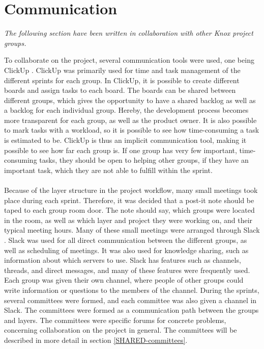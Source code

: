 \section{Communication}\label{communication_in_knox}
\textit{The following section have been written in collaboration with other Knox project groups.}


To collaborate on the project, several communication tools were used, one being ClickUp \cite{clickup}. ClickUp was primarily used for time and task management of the different sprints for each group. In ClickUp, it is possible to create different boards and assign tasks to each board. The boards can be shared between different groups, which gives the opportunity to have a shared backlog as well as a backlog for each individual group. Hereby, the development process becomes more transparent for each group, as well as the product owner. It is also possible to mark tasks with a workload, so it is possible to see how time-consuming a task is estimated to be. ClickUp is thus an implicit communication tool, making it possible to see how far each group is. If one group has very few important, time-consuming tasks, they should be open to helping other groups, if they have an important task, which they are not able to fulfill within the sprint.
\\\\
Because of the layer structure in the project workflow, many small meetings took place during each sprint. Therefore, it was decided that a post-it note should be taped to each group room door. The note should say, which groups were located in the room, as well as which layer and project they were working on, and their typical meeting hours. 
Many of these small meetings were arranged through Slack \cite{slack}. Slack was used for all direct communication between the different groups, as well as scheduling of meetings. It was also used for knowledge sharing, such as information about which servers to use. Slack has features such as channels, threads, and direct messages, and many of these features were frequently used. Each group was given their own channel, where people of other groups could write information or questions to the members of the channel. During the sprints, several committees were formed, and each committee was also given a channel in Slack. The committees were formed as a communication path between the groups and layers. The committees were specific forums for concrete problems, concerning collaboration on the project in general. The committees will be described in more detail in section \ref{SHARED-committees}.
